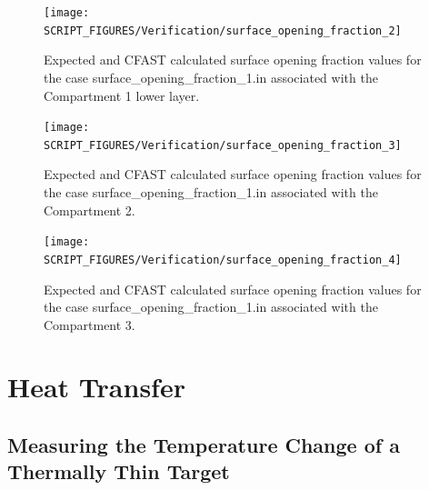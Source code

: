 \begin{figure}[!ht]
\centering
\texttt{[image: SCRIPT\_FIGURES/Verification/surface\_opening\_fraction\_2]}
\caption[Results of the test case {\ct surface\_opening\_fraction\_1.in}]{Expected and CFAST calculated surface opening fraction values for the case {\ct surface\_opening\_fraction\_1.in} associated with the Compartment 1 lower layer.}
\label{SOF_Result_2}
\end{figure}

\begin{figure}[!ht]
\centering
\texttt{[image: SCRIPT\_FIGURES/Verification/surface\_opening\_fraction\_3]}
\caption[Results of the test case {\ct surface\_opening\_fraction\_1.in}]{Expected and CFAST calculated surface opening fraction values for the case {\ct surface\_opening\_fraction\_1.in} associated with the Compartment 2.}
\label{SOF_Result_3}
\end{figure}

\begin{figure}[!ht]
\centering
\texttt{[image: SCRIPT\_FIGURES/Verification/surface\_opening\_fraction\_4]}
\caption[Results of the test case {\ct surface\_opening\_fraction\_1.in}]{Expected and CFAST calculated surface opening fraction values for the case {\ct surface\_opening\_fraction\_1.in} associated with the Compartment 3.}
\label{SOF_Result_4}
\end{figure}


\clearpage


\section{Heat Transfer}
\label{radiation}

\subsection{Measuring the Temperature Change of a Thermally Thin Target}
\label{radiation_1}

